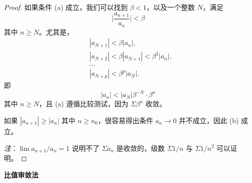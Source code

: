 \documentclass[../poma-notes.tex]{subfiles}
\begin{document}
\begin{proof}
  如果条件 (a) 成立，我们可以找到 $\beta < 1$，以及一个整数 $N$，满足
  \[ \Biggl|\frac{a_{n+1}}{a_n}\Biggr| < \beta \]
  其中 $n \ge N$。尤其是，
  \begin{align*}
     & |a_{N+1}| < \beta|a_n|,                    \\
     & |a_{N+2}| < \beta|a_{N+1}| < \beta^2|a_n|, \\
     & \dots                                      \\
     & |a_{N+p}| < \beta^p |a_N|.
  \end{align*}
  即
  \[ |a_n| < |a_N|\beta^{-N} \cdot \beta^n \]
  其中 $n \ge N$，且 (a) 遵循比较测试，因为 $\Sigma \beta^n$ 收敛。

  如果 $|a_{n+1}| \ge |a_n|$ 其中 $n \ge n_0$，很容易得出条件 $a_n \to 0$ 并不成立，因此 (b) 成立。

  \textit{注}：$\lim a_{n+1}/a_n = 1$ 说明不了 $\Sigma a_n$ 是收敛的，级数 $\Sigma 1/n$ 与 $\Sigma 1/n^2$ 可以证明。
\end{proof}

\anote \textbf{比值审敛法}

\end{document}
